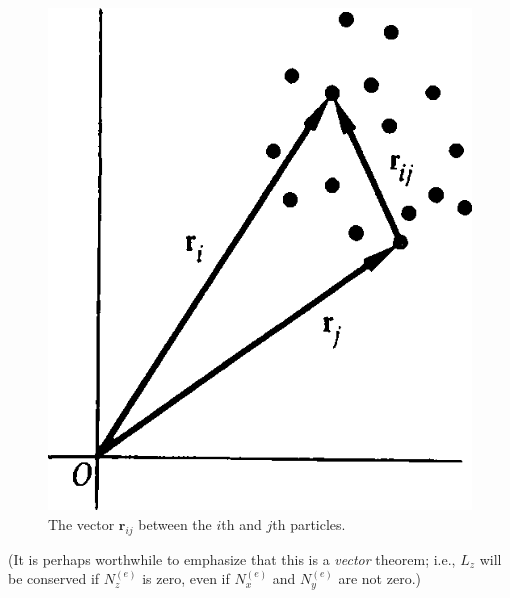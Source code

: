 \begin{figure}[htbp]
    \centering
    \includegraphics[scale = 0.225]{01/figures/1.2}
    \caption{The vector \(\symbf{r}_{ij}\) between the \(i\)th and \(j\)th particles.}
    \label{fig:1.2}
\end{figure}

(It is perhaps worthwhile to emphasize that this is a \emph{vector} theorem; i.e., \(L_z\) will be conserved if \(N_z^{\left(e\right)}\) is zero, even if \(N_x^{\left(e\right)}\) and \(N_y^{\left(e\right)}\) are not zero.)

